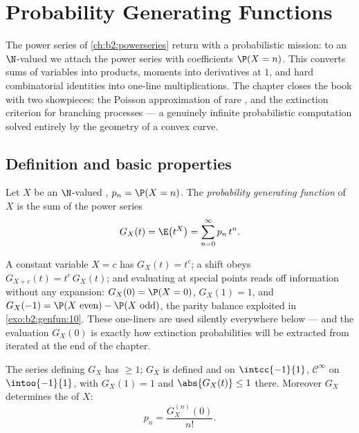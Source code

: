 \chapter{Probability Generating Functions}\label{ch:b2:genfun}

The power series of \cref{ch:b2:powerseries} return with a
probabilistic mission: to an $\N$-valued  we attach
the power series with coefficients $\P(X = n)$. This
\emph{} converts sums of  variables
into products, moments into derivatives at $1$, and hard
combinatorial identities into one-line multiplications. The
chapter closes the book with two showpieces: the Poisson
approximation of rare , and the extinction criterion for
branching processes --- a genuinely infinite probabilistic
computation solved entirely by the geometry of a convex curve.

\section{Definition and basic properties}

\begin{definition}\label{def:b2:genfun:pgf}
Let $X$ be an $\N$-valued , $p_n = \P(X = n)$. The
\emph{probability generating function} of $X$ is the sum of the
power series
\[
G_X(t) = \E\bigl(t^X\bigr) = \sum_{n=0}^{\infty} p_n\,t^n .
\]
\end{definition}

\begin{example}\label{ex:b2:genfun:firstreflexes}
A constant variable $X = c$ has $G_X(t) = t^c$; a shift obeys
$G_{X+c}(t) = t^c\,G_X(t)$; and evaluating at special points
reads off information without any expansion: $G_X(0) = \P(X
= 0)$, $G_X(1) = 1$, and $G_X(-1) = \P(X\text{ even}) -
\P(X\text{ odd})$, the parity balance exploited in
\cref{exo:b2:genfun:10}. These one-liners are used silently
everywhere below --- and the evaluation $G_X(0)$ is exactly
how extinction probabilities will be extracted from iterated
 at the end of the chapter.
\end{example}

\begin{proposition}\label{prop:b2:genfun:radius}
The series defining $G_X$ has  $\geq 1$;
$G_X$ is defined and  on $\intcc{-1}{1}$,
$\mathcal{C}^\infty$ on $\intoo{-1}{1}$, with $G_X(1) = 1$ and
$\abs{G_X(t)} \leq 1$ there. Moreover $G_X$ determines the  of
$X$:
\[
p_n = \frac{G_X^{(n)}(0)}{n!} .
\]
\end{proposition}

